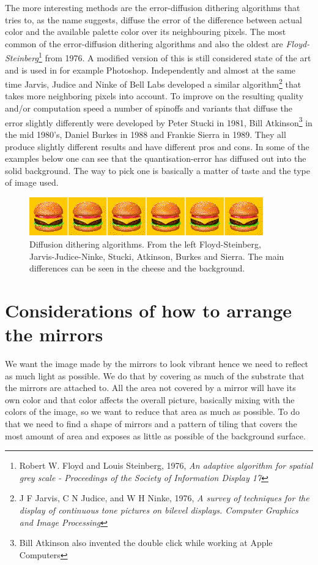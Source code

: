 \documentclass{article}
\begin{document}
The more interesting methods are the error-diffusion dithering
algorithms that tries to, as the name suggests, diffuse the error of the
difference between actual color and the available palette color over
its neighbouring pixels. The most common of the error-diffusion
dithering algorithms and also the oldest are
\emph{Floyd-Steinberg}\footnote{Robert W. Floyd and Louis Steinberg,
  1976, \emph{An adaptive algorithm for spatial grey scale - Proceedings
  of the Society of Information Display 17}} from 1976. A modified
version of this is still considered state of the art and is used in for example Photoshop. 
Independently and almost at the same time Jarvis, Judice and Ninke of Bell Labs
developed a similar algorithm\footnote{J F Jarvis, C N Judice, and W H
  Ninke, 1976, \emph{A survey of techniques for the display of
  continuous tone pictures on bilevel displays. Computer Graphics and
  Image Processing}} that takes more neighboring pixels into account. To improve on the resulting quality and/or
computation speed a number of spinoffs and variants that diffuse the
error slightly differently were developed by Peter Stucki in 1981, Bill
Atkinson\footnote{Bill Atkinson also invented the double click while
  working at Apple Computers} in the mid 1980's, Daniel Burkes in 1988
and Frankie Sierra in 1989. They all produce slightly different results
and have different pros and cons. In some of the examples below one can
see that the quantisation-error has diffused out into the solid
background. The way to pick one is basically a matter of taste and the
type of image used.

\begin{figure}[ht!]
\centering
\includegraphics[width=0.9\textwidth]{images/walkthrough/all-dithering.png}
\caption{Diffusion dithering algorithms. From the left Floyd-Steinberg, Jarvis-Judice-Ninke, Stucki, Atkinson, Burkes and Sierra. The main differences can be seen in the cheese and the background.}
\end{figure}


\section{Considerations of how to arrange the mirrors}

We want the image made by the mirrors to look vibrant hence we need to reflect
as much light as possible. We do that by covering as much of the substrate that
the mirrors are attached to. All the area not covered by a mirror will
have its own color and that color affects the overall picture,
basically mixing with the colors of the image, so we want to reduce that area as
much as possible. To do that we need to find a shape of mirrors and a
pattern of tiling that covers the most amount of area and exposes as
little as possible of the background surface.
\end{document}
